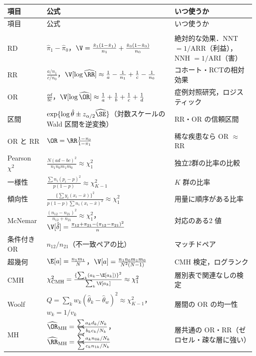\begin{center}\small
\renewcommand{\arraystretch}{1.5}
\begin{longtable}{@{}L{25mm}L{80mm}L{45mm}@{}}
\toprule
項目 & 公式 & いつ使うか\\
\midrule
\endfirsthead
\toprule
項目 & 公式 & いつ使うか\\
\midrule
\endhead
\bottomrule
\endfoot
{}\\
RD & $\hat\pi_1-\hat\pi_0$，$\V=\frac{\hat\pi_1(1-\hat\pi_1)}{n_1}+\frac{\hat\pi_0(1-\hat\pi_0)}{n_0}$ & 絶対的な効果．NNT $=1/\mathrm{ARR}$（利益），NNH $=1/\mathrm{ARI}$（害）\\
RR & $\frac{a/n_1}{c/n_0}$，$\V[\log\widehat{\RR}]\approx\frac1a-\frac1{n_1}+\frac1c-\frac1{n_0}$ & コホート・RCTの相対効果\\
OR & $\frac{ad}{bc}$，$\V[\log\widehat{\OR}]\approx\frac1a+\frac1b+\frac1c+\frac1d$ & 症例対照研究，ロジスティック\\
区間 & $\exp\{\log\hat\theta\pm z_{\alpha/2}\widehat{\SE}\}$（対数スケールの Wald 区間を逆変換） & RR・OR の信頼区間\\
OR と RR & $\OR=\RR\frac{1-\pi_0}{1-\pi_1}$ & 稀な疾患なら OR $\approx$ RR\\
Pearson $\chi^2$ & $\frac{N(ad-bc)^2}{n_1n_0m_1m_0}\approx\chi^2_1$ & 独立2群の比率の比較\\
一様性 & $\frac{\sum n_i(p_i-p)^2}{p(1-p)}\approx\chi^2_{K-1}$ & $K$ 群の比率\\
傾向性 & $\frac{\{\sum y_i(x_i-\bar x)\}^2}{p(1-p)\sum n_i(x_i-\bar x)^2}\approx\chi^2_1$ & 用量に順序がある比率\\
McNemar & $\frac{(n_{12}-n_{21})^2}{n_{12}+n_{21}}\approx\chi^2_1$，$\V[\hat\delta]=\frac{\pi_{12}+\pi_{21}-(\pi_{12}-\pi_{21})^2}{n}$ & 対応のある2 値\\
条件付き OR & $n_{12}/n_{21}$（不一致ペアの比） & マッチドペア\\
超幾何 & $\E[a]=\frac{n_1m_1}{N}$，$\V[a]=\frac{n_1n_0m_1m_0}{N^2(N-1)}$ & CMH 検定，ログランク\\
CMH & $\chi^2_{\mathrm{CMH}}=\frac{\{\sum_k(a_k-\E[a_k])\}^2}{\sum_k\V[a_k]}\approx\chi^2_1$ & 層別表で関連なしの検定\\
Woolf & $Q=\sum_kw_k(\hat\theta_k-\hat\theta_w)^2\approx\chi^2_{K-1}$，$w_k=1/v_k$ & 層間の OR の均一性\\
MH & $\widehat\OR_{\mathrm{MH}}=\frac{\sum a_kd_k/N_k}{\sum b_kc_k/N_k}$，$\widehat\RR_{\mathrm{MH}}=\frac{\sum a_kn_{0k}/N_k}{\sum c_kn_{1k}/N_k}$ & 層共通の OR・RR（ゼロセル・疎な層に強い）\\

\end{longtable}
\end{center}
